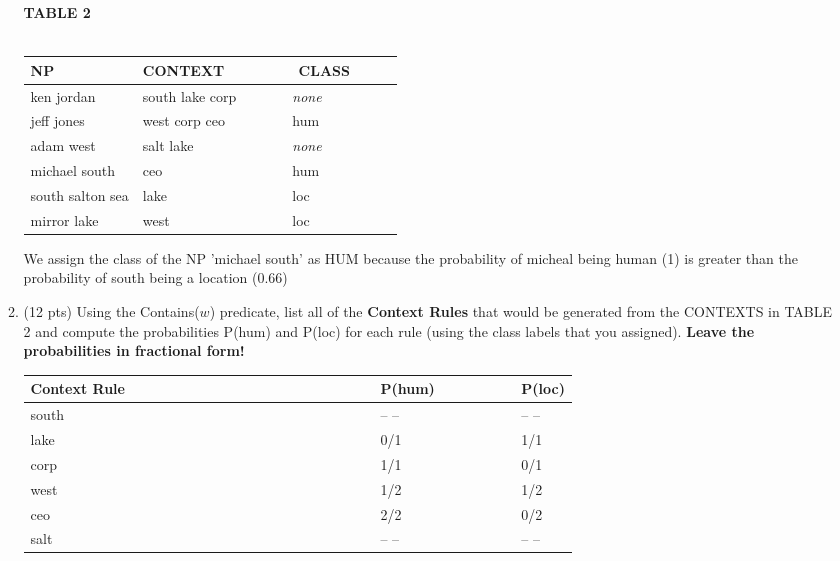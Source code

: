 \documentclass[11pt]{article}
\begin{document}
\begin{enumerate}
\begin{enumerate}
 \begin{center}
 \textbf{TABLE 2} \\  ~ \\
 \begin{tabular}{|lll|} \hline
 \textbf{NP}  & \textbf{CONTEXT} & \textbf{~~~~~~CLASS~~~~~} \\ \hline
 ken jordan & south lake corp & {~~~~~~\it{none}~~~~~} \\ 
 jeff jones &  west corp ceo &  {~~~~~~\sc hum~~~~~} \\ 
 adam west & salt lake  &   {~~~~~~\it none~~~~~}\\ 
 michael south  & ceo  &  {~~~~~~\sc hum~~~~~}  \\ 
 south salton sea   & lake &   {~~~~~~\sc loc~~~~~} \\ 
 mirror lake & west   &   {~~~~~~\sc loc~~~~~} \\ \hline 
 \end{tabular}
 \end{center}
 \vspace*{.2in}

We assign the class of the NP 'michael south' as HUM because the probability of micheal being human (1) is greater than the probability of south being a location (0.66)

\item (12 pts) Using the Contains($w$) predicate, list all of the 
\textbf{Context Rules} that would be generated from the CONTEXTS in TABLE
  2 and compute the probabilities P({\sc hum}) and P({\sc loc}) for
  each rule (using the class labels that you assigned). 
\textbf{Leave the     probabilities in fractional form!}  \\

   \begin{center} 
    \begin{tabular}{lll} 
   \textbf{Context Rule~~~~~~~~~~~~~~~~~~~~~~~~~~~~~~} &
   \textbf{P({\sc hum)~~~~~~~~~}} & \textbf{P({\sc loc})} \\ \hline
   south    ~ &  -- -- &  -- --\\ \hline
   lake   ~ & 0/1 & 1/1 \\ \hline
   corp    ~ & 1/1 & 0/1 \\ \hline
   west    ~ & 1/2 & 1/2 \\ \hline
   ceo    ~ & 2/2 & 0/2\\ \hline
   salt    ~ & -- -- & -- -- \\ \hline
   \end{tabular}
   \end{center}
 \vspace*{.2in}



\end{enumerate}
\end{enumerate}
\end{document}
